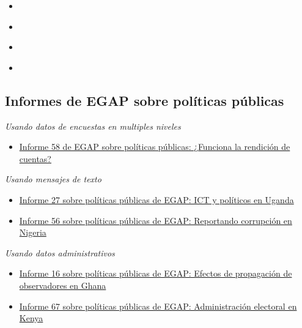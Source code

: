 \documentclass[
  12pt,
  spanish,
]{book}
\providecommand{\tightlist}{%
  \setlength{\itemsep}{0pt}\setlength{\parskip}{0pt}}
\begin{document}
\begin{itemize}
\item
  \autocite{adcocoll:2001}
\item
  \autocite{scacco_can_2018}
\item
  \autocite{shadish2002experimental}
\item
  \autocite{vicente_is_2014}
\end{itemize}

\hypertarget{informes-de-egap-sobre-poluxedticas-puxfablicas-2}{%
\subsection{Informes de EGAP sobre políticas públicas}\label{informes-de-egap-sobre-poluxedticas-puxfablicas-2}}

\emph{Usando datos de encuestas en multiples niveles}

\begin{itemize}
\tightlist
\item
  \href{https://egap.org/resource/does-bottom-up-accountability-work-evidence-from-uganda/}{Informe 58 de EGAP sobre políticas públicas: ¿Funciona la rendición de cuentas?}
\end{itemize}

\emph{Usando mensajes de texto}

\begin{itemize}
\item
  \href{https://egap.org/resource/brief-27-ict-and-politicians-in-uganda/}{Informe 27 sobre políticas públicas de EGAP: ICT y políticos en Uganda}
\item
  \href{https://egap.org/resource/reporting-corruption-in-nigeria-testing-the-effects-of-norms-nudges/}{Informe 56 sobre políticas públicas de EGAP: Reportando corrupción en Nigeria}
\end{itemize}

\emph{Usando datos administrativos}

\begin{itemize}
\item
  \href{https://egap.org/resource/brief-16-spillover-effects-of-observers-in-ghana/}{Informe 16 sobre políticas públicas de EGAP: Efectos de propagación de observadores en Ghana}
\item
  \href{https://egap.org/resource/electoral-administration-in-kenya/}{Informe 67 sobre políticas públicas de EGAP: Administración electoral en Kenya}
\end{itemize}
\end{document}
